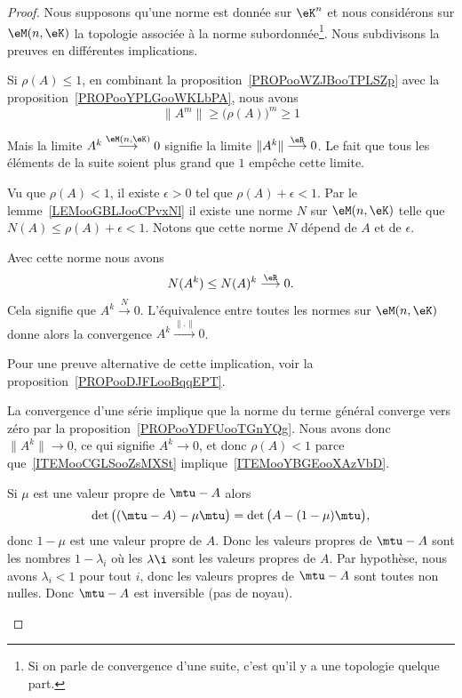 \begin{proof}
	Nous supposons qu'une norme est donnée sur \( \eK^n\) et nous considérons sur \( \eM(n,\eK)\) la topologie associée à la norme subordonnée\footnote{Si on parle de convergence d'une suite, c'est qu'il y a une topologie quelque part.}. Nous subdivisons la preuves en différentes implications.
	\begin{subproof}
		Si \( \rho(A)\leq 1\), en combinant la proposition~\ref{PROPooWZJBooTPLSZp} avec la proposition~\ref{PROPooYPLGooWKLbPA}, nous avons
		\begin{equation}
			\| A^m \|\geq \big( \rho(A) \big)^m\geq 1
		\end{equation}

		Mais la limite \( A^k\stackrel{\eM(n,\eK)}{\longrightarrow} 0\) signifie la limite \( \| A^k \|\stackrel{\eR}{\longrightarrow}0\). Le fait que tous les éléments de la suite soient plus grand que \( 1\) empêche cette limite.

		Vu que \( \rho(A)<1\), il existe \( \epsilon>0\) tel que \( \rho(A)+\epsilon<1\). Par le lemme~\ref{LEMooGBLJooCPvxNl} il existe une norme \( N\) sur \( \eM(n,\eK)\) telle que \( N(A)\leq \rho(A)+\epsilon<1\). Notons que cette norme \( N\) dépend de \( A\) et de \( \epsilon\).

		Avec cette norme nous avons
		\begin{equation}
			N(A^k)\leq N(A)^k\stackrel{\eR}{\longrightarrow}0.
		\end{equation}
		Cela signifie que \( A^k\stackrel{N}{\longrightarrow}0\). L'équivalence entre toutes les normes sur \( \eM(n,\eK)\) donne alors la convergence \( A^k\stackrel{\| . \|}{\longrightarrow}0\).

		Pour une preuve alternative de cette implication, voir la proposition~\ref{PROPooDJFLooBqqEPT}.


		La convergence d'une série implique que la norme du terme général converge vers zéro par la proposition~\ref{PROPooYDFUooTGnYQg}. Nous avons donc \( \| A^k \|\to 0\), ce qui signifie \( A^k\to 0\), et donc \( \rho(A)<1\) parce que~\ref{ITEMooCGLSooZsMXSt} implique~\ref{ITEMooYBGEooXAzVbD}.


		Si \( \mu\) est une valeur propre de \( \mtu-A\) alors
		\begin{equation}
			\det\big( (\mtu-A)-\mu\mtu \big)=\det\big( A-(1-\mu)\mtu \big),
		\end{equation}
		donc \( 1-\mu\) est une valeur propre de \( A\). Donc les valeurs propres de \( \mtu-A\) sont les nombres \( 1-\lambda_i\) où les \( \lambda\i\) sont les valeurs propres de \( A\). Par hypothèse, nous avons \( \lambda_i<1\) pour tout \( i\), donc les valeurs propres de \( \mtu-A\) sont toutes non nulles. Donc \( \mtu-A\) est inversible (pas de noyau).


\end{subproof}
\end{proof}
